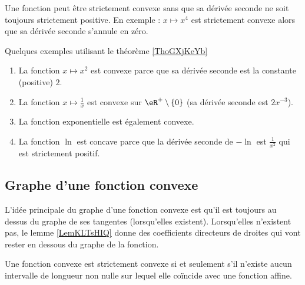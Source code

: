 \begin{remark}      \label{REMooVRPQooIybxmp}
    Une fonction peut être strictement convexe sans que sa dérivée seconde ne soit toujours strictement positive. En exemple : \( x\mapsto x^4\) est strictement convexe alors que sa dérivée seconde s'annule en zéro.
\end{remark}

\begin{example} \label{ExPDRooZCtkOz}
    Quelques exemples utilisant le théorème \ref{ThoGXjKeYb}
    \begin{enumerate}
        \item
    La fonction \( x\mapsto x^2\) est convexe parce que sa dérivée seconde est la constante (positive) \( 2\).
\item La fonction \( x\mapsto\frac{1}{ x }\) est convexe sur \( \eR^+\setminus\{ 0 \}\) (sa dérivée seconde est \( 2x^{-3}\)).
\item
    La fonction exponentielle est également convexe.
\item
    La fonction \( \ln\) est concave parce que la dérivée seconde de \( -\ln\) est \( \frac{1}{ x^2 }\) qui est strictement positif.
    \end{enumerate}
\end{example}


\subsection{Graphe d'une fonction convexe}

L'idée principale du graphe d'une fonction convexe est qu'il est toujours au dessus du graphe de ses tangentes (lorsqu'elles existent). Lorsqu'elles n'existent pas, le lemme \ref{LemKLTsHIQ} donne des coefficients directeurs de droites qui vont rester en dessous du graphe de la fonction.

\begin{proposition}      \label{PROPooOCOEooEGybmS}
    Une fonction convexe est strictement convexe si et seulement s'il n'existe aucun intervalle de longueur non nulle sur lequel elle coïncide avec une fonction affine.
\end{proposition}

